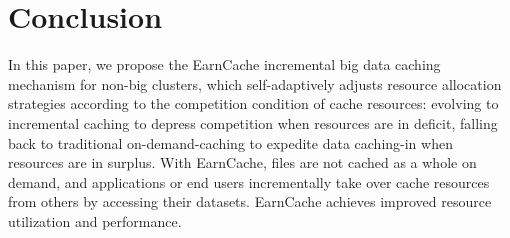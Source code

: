 \documentclass[letterpaper,twocolumn,10pt]{article}
\begin{document}


%







\section{Conclusion}\label{sec:Conclusion}

In this paper, we propose the EarnCache incremental big data caching mechanism for non-big clusters, which self-adaptively adjusts resource allocation strategies according to the competition condition of cache resources: evolving to incremental caching to depress competition when resources are in deficit, falling back to traditional on-demand-caching to expedite data caching-in when resources are in surplus. With EarnCache, files are not cached as a whole on demand, and applications or end users incrementally take over cache resources from others by accessing their datasets. EarnCache achieves improved resource utilization and performance.

%
%
\end{document}
